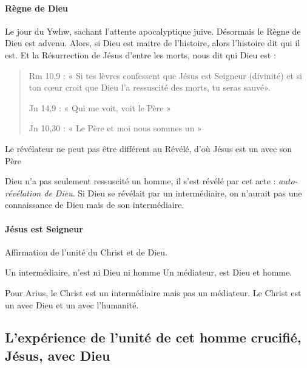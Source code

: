     \paragraph{Règne de Dieu} Le jour du Ywhw, sachant l'attente apocalyptique juive. Désormais le Règne de Dieu est advenu. Alors, si Dieu est maitre de l'histoire, alors l'histoire dit qui il est. Et la Résurrection de Jésus d'entre les morts, nous dit qui Dieu est : 
  \begin{quote}
    Rm  10,9  :  «  Si  tes  lèvres  confessent  que  Jésus  est  Seigneur  (divinité)  et  si  ton  cœur  croit  que Dieu l’a  ressuscité  des  morts, tu seras  sauvé».   
    
    Jn 14,9  :  «  Qui  me  voit, voit  le  Père  »   
    
    Jn 10,30  :  «  Le  Père  et  moi  nous  sommes  un  » 
\end{quote}
    
    \begin{Prop}
    Le révélateur ne peut pas être différent au Révélé, d'où Jésus est un avec son Père
    \end{Prop}
    Dieu n'a pas seulement ressuscité un homme, il s'est révélé par cet acte : \textit{auto-révélation de Dieu}. Si Dieu se révélait par un intermédiaire, on n'aurait pas une connaissance de Dieu mais de son intermédiaire.
    \paragraph{Jésus est Seigneur} Affirmation de l'unité du Christ et de Dieu.
    
    \begin{Def}
    Un intermédiaire, n'est ni Dieu ni homme
    Un médiateur, est Dieu et homme.
    \end{Def}
    Pour Arius, le Christ est un intermédiaire mais pas un médiateur.
        Le Christ est un avec Dieu et un avec l'humanité.
    
\subsection{L'expérience de l'unité de cet homme crucifié, Jésus, avec Dieu}
    
